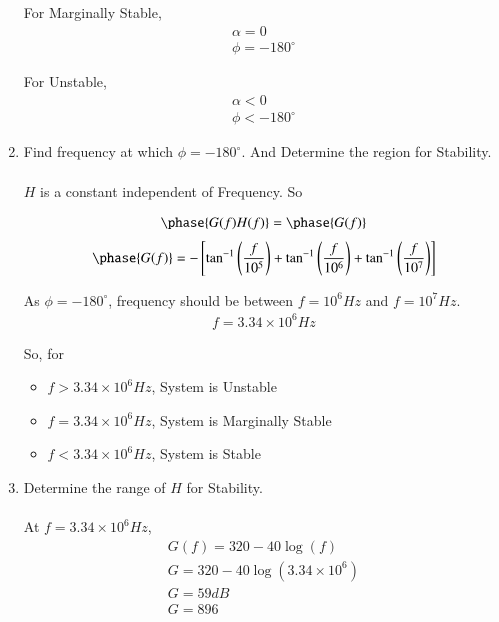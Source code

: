 \begin{enumerate}[label=\thesection.\arabic*.,ref=\thesection.\theenumi]
For Marginally Stable,
\begin{align}
\alpha = 0\\
\phi = -180^{\circ}
\end{align}

For Unstable,
\begin{align}
\alpha < 0\\
\phi < -180^{\circ}
\end{align}
\item Find frequency at which $\phi = -180^{\circ}$. And Determine the region for Stability.\\
\solution\\
$H$ is a constant independent of Frequency. So

\begin{align}
\phase{G(f)H(f)} = \phase{G(f)}
\end{align}
\begin{align}
\phase{G(f)} = -\sbrak{\tan ^{-1}\brak{\frac{f}{10^{5}}}+\tan ^{-1}\brak{\frac{f}{10^{6}}}+\tan ^{-1}\brak{\frac{f}{10^{7}}}}
\end{align}

As $\phi = -180^{\circ}$, frequency should be between $f=10^{6}Hz$ and $f=10^{7}Hz$.
\begin{align}
f = 3.34\times 10^6 Hz
\end{align}

So, for 
\begin{itemize}
\item $f > 3.34\times 10^6 Hz$, System is Unstable
\item $f = 3.34\times 10^6 Hz$, System is Marginally Stable
\item $f < 3.34\times 10^6 Hz$, System is Stable
\end{itemize}
\item Determine the range of $H$ for Stability.\\
\solution\\
At $f = 3.34\times 10^6 Hz$,
\begin{align}
G(f) = 320 - 40\log(f)\\
G = 320 - 40\log(3.34\times 10^6)\\
G = 59 dB \\
G = 896
\end{align}


\end{enumerate}
